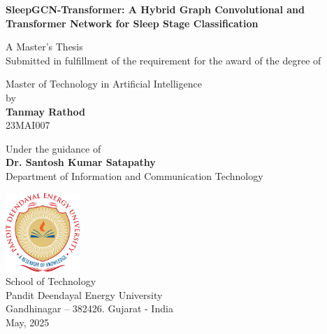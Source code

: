 \begin{center}
	{{\Large \textbf{SleepGCN-Transformer: A Hybrid Graph Convolutional and\\
				Transformer Network for Sleep Stage Classification}}}\\
	\vspace{0.6cm}
	
	{\large A Master's Thesis}\\
	{\large Submitted in {\Huge } fulfillment of the requirement for the award of the degree of}\\
	\vspace{0.8cm}
	
	{\large Master of Technology in Artificial Intelligence}\\
	{\large by}\\
	
	\textbf{{\Large Tanmay Rathod}}\\
	{\large 23MAI007}\\
	\vspace{0.7cm}
	
	{\large Under the guidance of}\\
	{\large \textbf{Dr. Santosh Kumar Satapathy}}\\
	
	{\large Department of Information and Communication Technology}\\
	\vspace{0.6cm}
	
	\vfill
	{\centering \includegraphics[width=0.21\textwidth]{img/pdpu_logo.png}}\\
	
	{\large School of Technology}\\
	{\large Pandit Deendayal Energy University}\\
	{\large Gandhinagar – 382426. Gujarat - India}\\
	{\large May, 2025}
\end{center}
